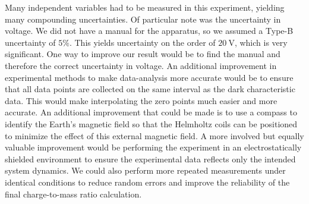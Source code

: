 \documentclass[prX,nofootinbib,notitlepage]{revtex4-1}
\begin{document}
Many independent variables had to be measured in this experiment, yielding many compounding uncertainties. Of particular note was the uncertainty in voltage. We did not have a manual for the apparatus, so we assumed a Type-B uncertainty of $5\%$. This yields uncertainty on the order of $20~\text{V}$, which is very significant. One way to improve our result would be to find the manual and therefore the correct uncertainty in voltage. An additional improvement in experimental methods to make data-analysis more accurate would be to ensure that all data points are collected on the same interval as the dark characteristic data. This would make interpolating the zero points much easier and more accurate. An additional improvement that could be made is to use a compass to identify the Earth's magnetic field so that the Helmholtz coils can be positioned to minimize the effect of this external magnetic field. A more involved but equally valuable improvement would be performing the experiment in an electrostatically shielded environment to ensure the experimental data reflects only the intended system dynamics. We could also perform more repeated measurements under identical conditions to reduce random errors and improve the reliability of the final charge-to-mass ratio calculation.



\end{document}
